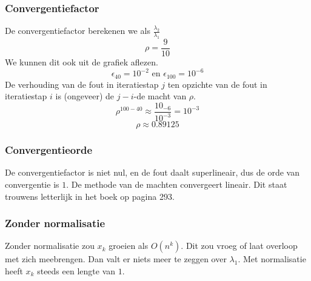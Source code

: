 \documentclass[examenvragen.tex]{subfiles}
\begin{document}
\subsubsection{Convergentiefactor}
De convergentiefactor berekenen we als $\frac{\lambda_{2}}{\lambda_{1}}$
\[
\rho = \frac{9}{10}
\]
We kunnen dit ook uit de grafiek aflezen.
\[
\epsilon_{40} = 10^{-2} \text{ en } \epsilon_{100} = 10^{-6}
\]
De verhouding van de fout in iteratiestap $j$ ten opzichte van de fout in iteratiestap $i$ is (ongeveer) de $j-i$-de macht van $\rho$.
\[
\rho^{100-40} \approx \frac{10_{-6}}{10^{-3}} = 10^{-3}
\]
\[
\rho \approx 0.89125
\]
\subsubsection{Convergentieorde}
De convergentiefactor is niet nul, en de fout daalt superlineair, dus de orde van convergentie is $1$. De methode van de machten convergeert lineair. Dit staat trouwens letterlijk in het boek op pagina 293.

\subsubsection{Zonder normalisatie}
Zonder normalisatie zou $x_{k}$ groeien als $O(n^{k})$. Dit zou vroeg of laat overloop met zich meebrengen. Dan valt er niets meer te zeggen over $\lambda_{1}$. Met normalisatie heeft $x_{k}$ steeds een lengte van $1$.



\end{document}
